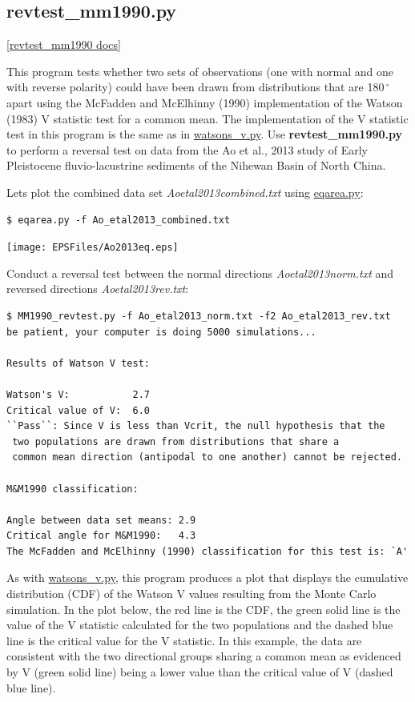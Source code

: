\documentclass[11pt]{book}
\begin{document}
{{{{
\subsection{revtest\_mm1990.py}
\href{https://github.com/PmagPy/PmagPy/blob/master/programs/revtest_mm1990.py}{[revtest\_mm1990 docs]}

This program tests whether two sets of observations (one with normal and one with reverse polarity) could have been drawn from distributions that are 180$\,^{\circ}$ apart using the McFadden and McElhinny (1990) implementation of the Watson (1983) V statistic test for a common mean. The implementation of the V statistic test in this program is the same as in \href{#Watsons_v.py}{watsons\_v.py}. Use \textbf{revtest\_mm1990.py} to perform a reversal test on data from the Ao et al., 2013 study of Early Pleistocene fluvio-lacustrine sediments of the Nihewan Basin of North China.

Lets plot the combined data set \textit{Ao\textunderscore etal2013\textunderscore combined.txt} using \href{#eqarea.py}{eqarea.py}:

\begin{verbatim}
$ eqarea.py -f Ao_etal2013_combined.txt
\end{verbatim}

\texttt{[image: EPSFiles/Ao2013eq.eps]}}

Conduct a reversal test between the normal directions \textit{Ao\textunderscore etal2013\textunderscore norm.txt} and reversed directions \textit{Ao\textunderscore etal2013\textunderscore rev.txt}:

\begin{verbatim}
$ MM1990_revtest.py -f Ao_etal2013_norm.txt -f2 Ao_etal2013_rev.txt
be patient, your computer is doing 5000 simulations...

Results of Watson V test:

Watson's V:           2.7
Critical value of V:  6.0
``Pass``: Since V is less than Vcrit, the null hypothesis that the
 two populations are drawn from distributions that share a
 common mean direction (antipodal to one another) cannot be rejected.

M&M1990 classification:

Angle between data set means: 2.9
Critical angle for M&M1990:   4.3
The McFadden and McElhinny (1990) classification for this test is: `A'
\end{verbatim}

As with \href{#Watsons_v.py}{watsons\_v.py}, this program produces a plot that displays the cumulative distribution (CDF) of the Watson V values resulting from the Monte Carlo simulation. In the plot below, the red line is the CDF, the green solid line is the value of the V statistic calculated for the two populations and the dashed blue line is the critical value for the V statistic. In this example, the data are consistent with the two directional groups sharing a common mean as evidenced by V (green solid line) being a lower value than the critical value of V (dashed blue line).

}}}
\end{document}
